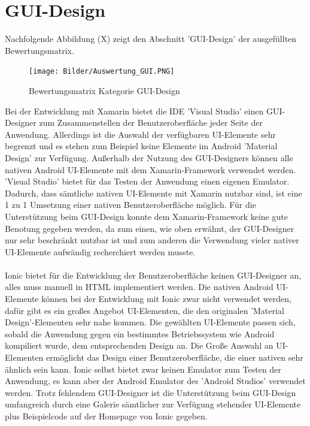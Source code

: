 \section{GUI-Design}

Nachfolgende Abbildung (X) zeigt den Abschnitt 'GUI-Design' der ausgefüllten Bewertungsmatrix.

\begin{figure}[h]
	\centering
	\texttt{[image: Bilder/Auswertung\_GUI.PNG]}
	\caption{Bewertungsmatrix Kategorie GUI-Design}
	\label{fig:AuswGUI}
\end{figure}

Bei der Entwicklung mit Xamarin bietet die IDE 'Visual Studio' einen GUI-Designer zum Zusammenstellen der Benutzeroberfläche jeder Seite der Anwendung. Allerdings ist die Auswahl der verfügbaren UI-Elemente sehr begrenzt und es stehen zum Beispiel keine Elemente im Android 'Material Design' zur Verfügung. Außerhalb der Nutzung des GUI-Designers können alle nativen Android UI-Elemente mit dem Xamarin-Framework verwendet werden. 'Visual Studio' bietet für das Testen der Anwendung einen eigenen Emulator. Dadurch, dass sämtliche nativen UI-Elemente mit Xamarin nutzbar sind, ist eine 1 zu 1 Umsetzung einer nativen Benutzeroberfläche möglich. Für die Unterstützung beim GUI-Design konnte dem Xamarin-Framework keine gute Benotung gegeben werden, da zum einen, wie oben erwähnt, der GUI-Designer nur sehr beschränkt nutzbar ist und zum anderen die Verwendung vieler nativer UI-Elemente aufwändig recherchiert werden musste. 
\\
\\
Ionic bietet für die Entwicklung der Benutzeroberfläche keinen GUI-Designer an, alles muss manuell in HTML implementiert werden. Die nativen Android UI-Elemente können bei der Entwicklung mit Ionic zwar nicht verwendet werden, dafür gibt es ein großes Angebot UI-Elementen, die den originalen 'Material Design'-Elementen sehr nahe kommen. Die gewählten UI-Elemente passen sich, sobald die Anwendung gegen ein bestimmtes Betriebssystem wie Android kompiliert wurde, dem entsprechenden Design an. Die Große Auswahl an UI-Elementen ermöglicht das Design einer Benutzeroberfläche, die einer nativen sehr ähnlich sein kann. Ionic selbst bietet zwar keinen Emulator zum Testen der Anwendung, es kann aber der Android Emulator des 'Android Studios' verwendet werden. Trotz fehlendem GUI-Designer ist die Unterstützung beim GUI-Design umfangreich durch eine Galerie sämtlicher zur Verfügung stehender UI-Elemente plus Beispielcode auf der Homepage von Ionic gegeben. 
